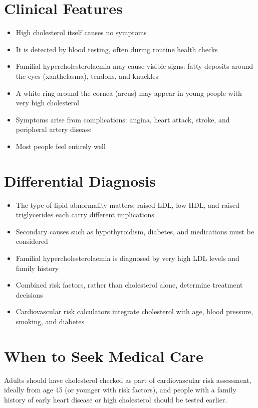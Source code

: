 \section*{Clinical Features}
\begin{itemize}
    \item High cholesterol itself causes no symptoms
    \item It is detected by blood testing, often during routine health checks
    \item Familial hypercholesterolaemia may cause visible signs: fatty deposits around the eyes (xanthelasma), tendons, and knuckles
    \item A white ring around the cornea (arcus) may appear in young people with very high cholesterol
    \item Symptoms arise from complications: angina, heart attack, stroke, and peripheral artery disease
    \item Most people feel entirely well
\end{itemize}

\section*{Differential Diagnosis}
\begin{itemize}
    \item The type of lipid abnormality matters: raised LDL, low HDL, and raised triglycerides each carry different implications
    \item Secondary causes such as hypothyroidism, diabetes, and medications must be considered
    \item Familial hypercholesterolaemia is diagnosed by very high LDL levels and family history
    \item Combined risk factors, rather than cholesterol alone, determine treatment decisions
    \item Cardiovascular risk calculators integrate cholesterol with age, blood pressure, smoking, and diabetes
\end{itemize}

\section*{When to Seek Medical Care}
Adults should have cholesterol checked as part of cardiovascular risk assessment, ideally from age 45 (or younger with risk factors), and people with a family history of early heart disease or high cholesterol should be tested earlier.

